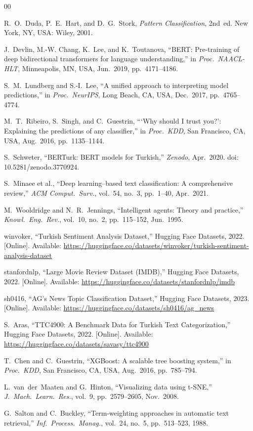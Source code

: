 \documentclass[conference]{IEEEtran}
\begin{document}
\begin{thebibliography}{00}

R.~O.~Duda, P.~E.~Hart, and D.~G.~Stork,
\textit{Pattern Classification}, 2nd~ed.
New York, NY, USA: Wiley, 2001.

J.~Devlin, M.-W. Chang, K.~Lee, and K.~Toutanova,
``BERT: Pre-training of deep bidirectional transformers for language understanding,''
in \textit{Proc.\ NAACL-HLT},
Minneapolis, MN, USA, Jun.\ 2019, pp.~4171--4186.

S.~M.~Lundberg and S.-I.~Lee,
``A unified approach to interpreting model predictions,''
in \textit{Proc.\ NeurIPS},
Long Beach, CA, USA, Dec.\ 2017, pp.~4765--4774.

M.~T.~Ribeiro, S.~Singh, and C.~Guestrin,
```Why should I trust you?': Explaining the predictions of any classifier,''
in \textit{Proc.\ KDD},
San Francisco, CA, USA, Aug.\ 2016, pp.~1135--1144.

S.~Schweter,
``BERTurk: BERT models for Turkish,''
\textit{Zenodo}, Apr.\ 2020.
doi: 10.5281/zenodo.3770924.

S.~Minaee et al.,
``Deep learning--based text classification: A comprehensive review,''
\textit{ACM Comput.\ Surv.}, vol.~54, no.~3, pp.~1--40, Apr.\ 2021.

M.~Wooldridge and N.~R.~Jennings,
``Intelligent agents: Theory and practice,''
\textit{Knowl.\ Eng.\ Rev.}, vol.~10, no.~2, pp.~115--152, Jun.\ 1995.

winvoker,
``Turkish Sentiment Analysis Dataset,''
Hugging Face Datasets, 2022.
[Online]. Available: \url{https://huggingface.co/datasets/winvoker/turkish-sentiment-analysis-dataset}

stanfordnlp,
``Large Movie Review Dataset (IMDB),''
Hugging Face Datasets, 2022.
[Online]. Available: \url{https://huggingface.co/datasets/stanfordnlp/imdb}

sh0416,
``AG's News Topic Classification Dataset,''
Hugging Face Datasets, 2023.
[Online]. Available: \url{https://huggingface.co/datasets/sh0416/ag_news}

S.~Aras,
``TTC4900: A Benchmark Data for Turkish Text Categorization,''
Hugging Face Datasets, 2022.
[Online]. Available: \url{https://huggingface.co/datasets/savasy/ttc4900}

T.~Chen and C.~Guestrin,
``XGBoost: A scalable tree boosting system,''
in \textit{Proc.\ KDD},
San Francisco, CA, USA, Aug.\ 2016, pp.~785--794.

L.~van~der~Maaten and G.~Hinton,
``Visualizing data using t-SNE,''
\textit{J.\ Mach.\ Learn.\ Res.}, vol.~9, pp.~2579--2605, Nov.\ 2008.

G.~Salton and C.~Buckley,
``Term-weighting approaches in automatic text retrieval,''
\textit{Inf.\ Process.\ Manag.}, vol.~24, no.~5, pp.~513--523, 1988.

\end{thebibliography}
\end{document}
